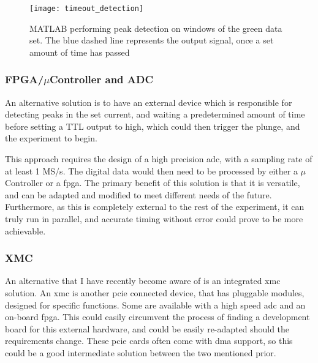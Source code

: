 \begin{figure}[htbp!]
	\centering
	\texttt{[image: timeout\_detection]}
	\caption[MATLAB windowed peak detection on generated data]{MATLAB performing peak detection on windows of the green data set. The blue dashed line represents the output signal, once a set amount of time has passed}
	\label{fig::timeout_detection}
\end{figure}

\subsubsection{FPGA/$\mu$Controller and ADC}
An alternative solution is to have an external device which is responsible for detecting peaks in the \gls{set} current, and waiting a predetermined amount of time before setting a TTL output to high, which could then trigger the plunge, and the experiment to begin.

This approach requires the design of a high precision \gls{adc}, with a sampling rate of at least 1 MS/s. The digital data would then need to be processed by either a $\mu$Controller or a \gls{fpga}. The primary benefit of this solution is that it is versatile, and can be adapted and modified to meet different needs of the future. Furthermore, as this is completely external to the rest of the experiment, it can truly run in parallel, and accurate timing without error could prove to be more achievable.
\subsubsection{XMC}
An alternative that I have recently become aware of is an integrated \gls{xmc} solution. An \gls{xmc} is another \gls{pcie} connected device, that has pluggable modules, designed for specific functions. Some are available with a high speed \gls{adc} and an on-board \gls{fpga}. This could easily circumvent the process of finding a development board for this external hardware, and could be easily re-adapted should the requirements change. These \gls{pcie} cards often come with \gls{dma} support, so this could be a good intermediate solution between the two mentioned prior.